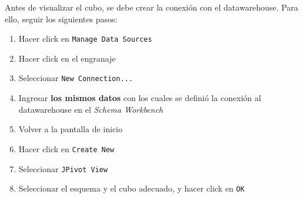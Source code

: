 Antes de visualizar el cubo, se debe crear la conexión con el datawarehouse. Para ello, seguir los siguientes pasos:

\begin{enumerate}
    \item Hacer click en \texttt{Manage Data Sources}
    \item Hacer click en el engranaje
    \item Seleccionar \texttt{New Connection...}
    \item Ingresar \textbf{los mismos datos} con los cuales se definió la conexión al datawarehouse en el \emph{Schema Workbench}   
    \item Volver a la pantalla de inicio
    \item Hacer click en \texttt{Create New}
    \item Seleccionar \texttt{JPivot View} 
    \item Seleccionar el esquema y el cubo adecuado, y hacer click en \texttt{OK} 
\end{enumerate}






\clearpage
\printbibliography



